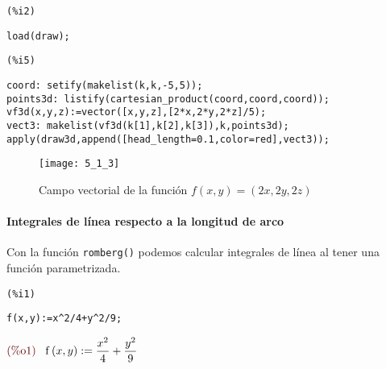 \documentclass[12pt]{article}
\begin{document}
\noindent
\begin{minipage}[t]{8ex}{\color{red}\bf
\begin{verbatim}
(%i2) 
\end{verbatim}}
\end{minipage}
\begin{minipage}[t]{\textwidth}{\color{blue}
\begin{verbatim}
load(draw);
\end{verbatim}}
\end{minipage}

\noindent
\begin{minipage}[t]{8ex}{\color{red}\bf
\begin{verbatim}
(%i5) 
\end{verbatim}}
\end{minipage}
\begin{minipage}[t]{\textwidth}{\color{blue}
\begin{verbatim}
coord: setify(makelist(k,k,-5,5));
points3d: listify(cartesian_product(coord,coord,coord));
vf3d(x,y,z):=vector([x,y,z],[2*x,2*y,2*z]/5);
vect3: makelist(vf3d(k[1],k[2],k[3]),k,points3d);
apply(draw3d,append([head_length=0.1,color=red],vect3));
\end{verbatim}}
\end{minipage}

\begin{figure}[H]
\centering
\texttt{[image: 5\_1\_3]}
\caption{Campo vectorial de la función $f(x,y)=(2x,2y,2z)$}
\end{figure}


\paragraph{Integrales de línea respecto a la longitud de arco} Con la función \texttt{romberg()} podemos calcular integrales de línea al tener una función parametrizada.

\noindent
\begin{minipage}[t]{8ex}{\color{red}\bf
\begin{verbatim}
(%i1) 
\end{verbatim}}
\end{minipage}
\begin{minipage}[t]{\textwidth}{\color{blue}
\begin{verbatim}
f(x,y):=x^2/4+y^2/9;
\end{verbatim}}
\end{minipage}
\begin{math}\displaystyle
\parbox{8ex}{\color{labelcolor}(\%o1) }
\mathrm{f}\left( x,y\right) :=\frac{{x}^{2}}{4}+\frac{{y}^{2}}{9}
\end{math}
\end{document}
